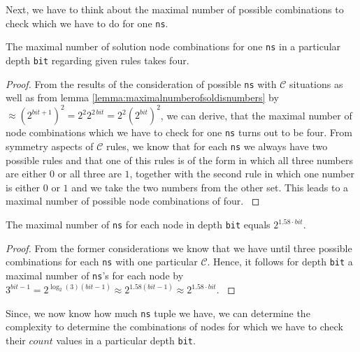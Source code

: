 Next, we have to think about the maximal number of possible combinations to check which we have to do for one \texttt{ns}.

\begin{lemma}
    The maximal number of solution node combinations for one \texttt{ns} in a particular depth \texttt{bit} regarding given rules takes four.
\label{lemma:maximalnumberofsolnodecombonens}
\end{lemma}

\begin{proof}
    From the results of the consideration of possible \texttt{ns} with $\mathcal{C}$ situations as well as from lemma \ref{lemma:maximalnumberofsoldisnumbers} by $\approx \left(2^{bit + 1}\right)^2 = 2^{2} 2^{2 \, bit} = 2^{2} \left(2^{bit}\right)^{2}$, we can derive, that the maximal number of node combinations which we have to check for one \texttt{ns} turns out to be four. From symmetry aspects of $\mathcal{C}$ rules, we know that for each \texttt{ns} we always have two possible rules and that one of this rules is of the form in which all three numbers are either $0$ or all three are $1$, together with the second rule in which one number is either $0$ or $1$ and we take the two numbers from the other set. This leads to a maximal number of possible node combinations of four.
\label{proof:maximalnumberofsolnodecombonens}
\end{proof}

\begin{lemma}
    The maximal number of \texttt{ns} for each node in depth \texttt{bit} equals $2^{1.58 \cdot bit}$.
\label{lemma:maximalnumberofnspernode}
\end{lemma}

\begin{proof}
    From the former considerations we know that we have until three possible combinations for each \texttt{ns} with one particular $\mathcal{C}$. Hence, it follows for depth \texttt{bit} a maximal number of \texttt{ns}'s for each node by $3^{bit - 1} = 2^{\log_{2}\left(3\right)\left(bit - 1\right)} \approx 2^{1.58 \left(bit - 1\right)} \approx 2^{1.58 \cdot bit}$.
\label{proof:maximalnumberofnspernode}
\end{proof}

Since, we now know how much \texttt{ns} tuple we have, we can determine the complexity to determine the combinations of nodes for which we have to check their $count$ values in a particular depth \texttt{bit}. 

